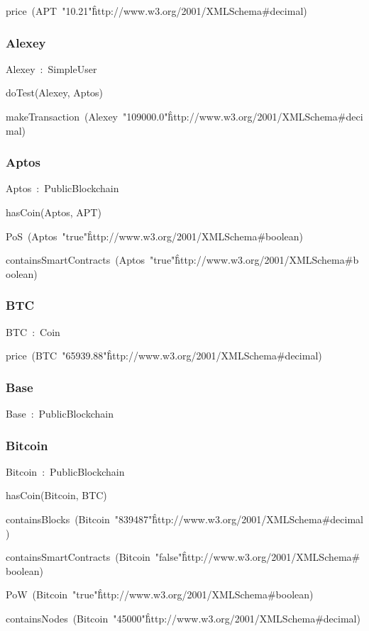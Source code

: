 \documentclass{article}
\begin{document}
price~(APT~"10.21"\^\^http://www.w3.org/2001/XMLSchema#decimal)

\subsubsection*{Alexey}

Alexey~:~SimpleUser

doTest(Alexey, Aptos)

makeTransaction~(Alexey~"109000.0"\^\^http://www.w3.org/2001/XMLSchema#decimal)

\subsubsection*{Aptos}

Aptos~:~PublicBlockchain

hasCoin(Aptos, APT)

PoS~(Aptos~"true"\^\^http://www.w3.org/2001/XMLSchema#boolean)

containsSmartContracts~(Aptos~"true"\^\^http://www.w3.org/2001/XMLSchema#boolean)

\subsubsection*{BTC}

BTC~:~Coin

price~(BTC~"65939.88"\^\^http://www.w3.org/2001/XMLSchema#decimal)

\subsubsection*{Base}

Base~:~PublicBlockchain

\subsubsection*{Bitcoin}

Bitcoin~:~PublicBlockchain

hasCoin(Bitcoin, BTC)

containsBlocks~(Bitcoin~"839487"\^\^http://www.w3.org/2001/XMLSchema#decimal)

containsSmartContracts~(Bitcoin~"false"\^\^http://www.w3.org/2001/XMLSchema#boolean)

PoW~(Bitcoin~"true"\^\^http://www.w3.org/2001/XMLSchema#boolean)

containsNodes~(Bitcoin~"45000"\^\^http://www.w3.org/2001/XMLSchema#decimal)
\end{document}
